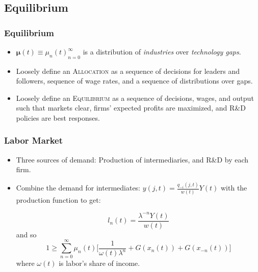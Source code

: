 \documentclass{beamer}
\begin{document}



\subsection{Equilibrium}
\label{sub:equilibrium}
\begin{frame}[t]\frametitle{Equilibrium} 
  \begin{itemize}

  \vspace{2mm}
  \item<+-> $\bm{\mu}(t) \equiv {\mu_n(t)}_{n=0}^\infty$ is a distribution of \emph{industries} over \emph{technology gaps}.
  
  \vspace{2mm}
  \item<+-> Loosely define an \textsc{Allocation} as a sequence of decisions for leaders and followers, sequence of wage rates, and a sequence of distributions over gaps.

  \vspace{2mm}
  \item<+-> Loosely define an \textsc{Equilibrium} as a sequence of decisions, wages, and output such that markets clear, firms' expected profits are maximized, and R\&D policies are best responses. 

  \end{itemize}
\end{frame}


\begin{frame}[t]\frametitle{Labor Market} 
  \begin{itemize}
    \item<+-> Three sources of demand: Production of intermediaries, and R\&D by each firm.
	\vspace{2mm}
    \item<+-> Combine the demand for intermediates: $y(j, t) = \frac{q_{-i}(j, t)}{w(t)}Y(t)$ with the production function to get:

      \begin{equation*}
        l_n(t) = \frac{\lambda^{-n}Y(t)}{w(t)}
      \end{equation*}
    and so
      \begin{equation*} \label{eq:labor_clearing}
        1 \geq \sum_{n=0}^{\infty} \mu_n(t) \Big[\frac{1}{\omega(t)\lambda^n} + G(x_n(t))    + G(x_{-n}(t))\Big]
      \end{equation*}
      where $\omega(t)$ is labor's share of income.

  \end{itemize}
\end{frame}
\end{document}

